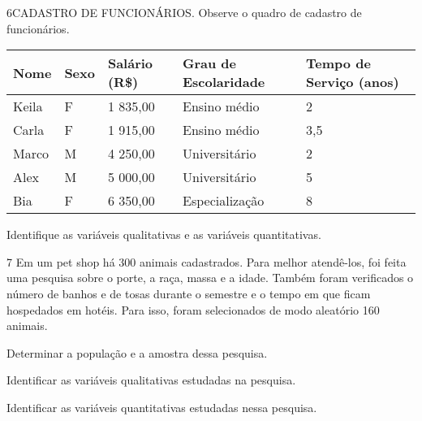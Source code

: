 
\num{6}CADASTRO DE FUNCIONÁRIOS. Observe o quadro de cadastro de
funcionários.

\begin{longtable}[]{@{}lllll@{}}
\toprule
\textbf{Nome} & \textbf{Sexo} & \textbf{Salário (R\$)} & \textbf{Grau de
Escolaridade} & \textbf{Tempo de Serviço (anos)}\tabularnewline
\midrule
\endhead
Keila & F & 1 835,00 & Ensino médio & 2\tabularnewline
Carla & F & 1 915,00 & Ensino médio & 3,5\tabularnewline
Marco & M & 4 250,00 & Universitário & 2\tabularnewline
Alex & M & 5 000,00 & Universitário & 5\tabularnewline
Bia & F & 6 350,00 & Especialização & 8\tabularnewline
\bottomrule
\end{longtable}

Identifique as variáveis qualitativas e as variáveis quantitativas.



\num{7} Em um pet shop há 300 animais cadastrados. Para melhor atendê-los,
foi feita uma pesquisa sobre o porte, a raça, massa e a idade. Também
foram verificados o número de banhos e de tosas durante o semestre e o
tempo em que ficam hospedados em hotéis. Para isso, foram selecionados
de modo aleatório 160 animais.

\begin{escolha}
\item
  Determinar a população e a amostra dessa pesquisa.


\item
  Identificar as variáveis qualitativas estudadas na pesquisa.


\item
  Identificar as variáveis quantitativas estudadas nessa pesquisa.

\end{escolha}


